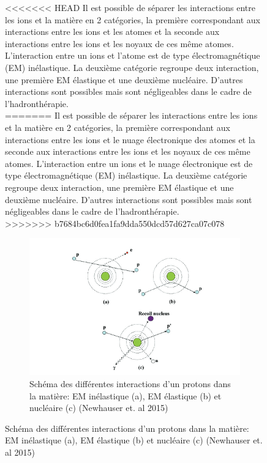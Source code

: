 \documentclass[11pt,a4paper,oldfontcommands]{memoir}
\begin{document}
\begin{figure}
<<<<<<< HEAD
Il est possible de séparer les interactions entre les ions et la matière en 2 catégories, la première correspondant aux interactions entre les ions et les atomes et la seconde aux interactions entre les ions et les noyaux de ces même atomes. L'interaction entre un ions et l'atome est de type électromagnétique (EM) inélastique. La deuxième catégorie regroupe deux interaction, une première EM élastique et une deuxième nucléaire. D'autres interactions sont possibles mais sont négligeables dans le cadre de l'hadronthérapie.\\
=======
Il est possible de séparer les interactions entre les ions et la matière en 2 catégories, la première correspondant aux interactions entre les ions et le nuage électronique des atomes et la seconde aux interactions entre les ions et les noyaux de ces même atomes. L'interaction entre un ions et le nuage électronique est de type électromagnétique (EM) inélastique. La deuxième catégorie regroupe deux interaction, une première EM élastique et une deuxième nucléaire. D'autres interactions sont possibles mais sont négligeables dans le cadre de l'hadronthérapie.\\
>>>>>>> b7684bc6d0fea1fa9dda550dcd57d627ca07c078
\begin{figure}[h!]
    \centering
    \includegraphics{intro/Newhauser2015.PNG}
    \caption{Schéma des différentes interactions d'un protons dans la matière: EM inélastique (a), EM élastique (b) et nucléaire (c) (Newhauser et. al 2015)}
    \label{fig:my_label}
\end{figure}


\end{figure}
\end{document}

